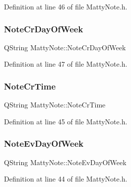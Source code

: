 Definition at line 46 of file Matty\+Note.\+h.

\hypertarget{classMattyNote_a3776d088e67ef0181116b1cc2db3fd94}{}\label{classMattyNote_a3776d088e67ef0181116b1cc2db3fd94} 
\subsubsection{\texorpdfstring{Note\+Cr\+Day\+Of\+Week}{NoteCrDayOfWeek}}
{\footnotesize\ttfamily Q\+String Matty\+Note\+::\+Note\+Cr\+Day\+Of\+Week\hspace{0.3cm}{\ttfamily [private]}}



Definition at line 47 of file Matty\+Note.\+h.

\hypertarget{classMattyNote_a03208145949dfb98a99cfd9d95373418}{}\label{classMattyNote_a03208145949dfb98a99cfd9d95373418} 
\subsubsection{\texorpdfstring{Note\+Cr\+Time}{NoteCrTime}}
{\footnotesize\ttfamily Q\+String Matty\+Note\+::\+Note\+Cr\+Time\hspace{0.3cm}{\ttfamily [private]}}



Definition at line 45 of file Matty\+Note.\+h.

\hypertarget{classMattyNote_a1182beac3edac3a7a7e4cdce72fc02ce}{}\label{classMattyNote_a1182beac3edac3a7a7e4cdce72fc02ce} 
\subsubsection{\texorpdfstring{Note\+Ev\+Day\+Of\+Week}{NoteEvDayOfWeek}}
{\footnotesize\ttfamily Q\+String Matty\+Note\+::\+Note\+Ev\+Day\+Of\+Week\hspace{0.3cm}{\ttfamily [private]}}



Definition at line 44 of file Matty\+Note.\+h.

\hypertarget{classMattyNote_a9644cd6552e27c1875d83edce2469db3}{}\label{classMattyNote_a9644cd6552e27c1875d83edce2469db3} 
